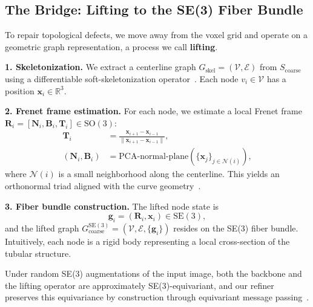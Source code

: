 \documentclass{article}
\newcommand{\SE}[1]{\mathrm{SE}(#1)}
\newcommand{\SO}[1]{\mathrm{SO}(#1)}
\begin{document}
\subsection{The Bridge: Lifting to the SE(3) Fiber Bundle}

To repair topological defects, we move away from the voxel grid and operate on a geometric graph representation, a process we call \textbf{lifting}.

\textbf{1. Skeletonization.}
We extract a centerline graph $G_{\text{skel}} = (\mathcal{V}, \mathcal{E})$ from $S_{\text{coarse}}$ using a differentiable soft-skeletonization operator~\cite{shit2021cldice,anonymous_ijcai}. Each node $v_i \in \mathcal{V}$ has a position $\mathbf{x}_i \in \mathbb{R}^3$.

\textbf{2. Frenet frame estimation.}
For each node, we estimate a local Frenet frame $\mathbf{R}_i = [\mathbf{N}_i, \mathbf{B}_i, \mathbf{T}_i] \in \SO{3}$:
\begin{align}
  \mathbf{T}_i &= \frac{\mathbf{x}_{i+1} - \mathbf{x}_{i-1}}{\|\mathbf{x}_{i+1} - \mathbf{x}_{i-1}\|}, \\
  (\mathbf{N}_i, \mathbf{B}_i) &= \text{PCA-normal-plane}(\{\mathbf{x}_j\}_{j \in \mathcal{N}(i)}),
\end{align}
where $\mathcal{N}(i)$ is a small neighborhood along the centerline. This yields an orthonormal triad aligned with the curve geometry~\cite{docarmo2016differential,anonymous_ijcai}.

\textbf{3. Fiber bundle construction.}
The lifted node state is
\begin{equation}
  \mathbf{g}_i = (\mathbf{R}_i, \mathbf{x}_i) \in \SE{3},
\end{equation}
and the lifted graph $G^{\SE{3}}_{\text{coarse}} = (\mathcal{V}, \mathcal{E}, \{\mathbf{g}_i\})$ resides on the SE(3) fiber bundle. Intuitively, each node is a rigid body representing a local cross-section of the tubular structure.

Under random SE(3) augmentations of the input image, both the backbone and the lifting operator are approximately SE(3)-equivariant, and our refiner preserves this equivariance by construction through equivariant message passing~\cite{satorras2021n,liao2024equiformer}.
\end{document}
